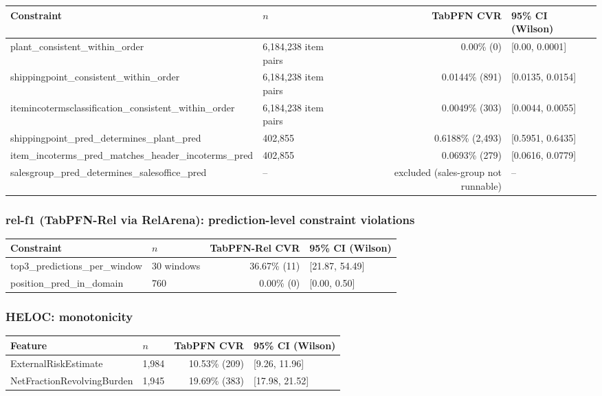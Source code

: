 \documentclass[11pt]{article}
\begin{document}
\begin{table}[h]
\centering
\small
\begin{tabularx}{\linewidth}{@{} L{5.9cm} l r l @{}}
\toprule
\textbf{Constraint} & \textbf{$n$} & \textbf{TabPFN CVR} & \textbf{95\% CI (Wilson)} \\
\midrule
plant\_consistent\_within\_order & 6{,}184{,}238 item pairs & 0.00\% (0) & [0.00, 0.0001] \\
shippingpoint\_consistent\_within\_order & 6{,}184{,}238 item pairs & 0.0144\% (891) & [0.0135, 0.0154] \\
itemincotermsclassification\_consistent\_within\_order & 6{,}184{,}238 item pairs & 0.0049\% (303) & [0.0044, 0.0055] \\
shippingpoint\_pred\_determines\_plant\_pred & 402{,}855 & 0.6188\% (2{,}493) & [0.5951, 0.6435] \\
item\_incoterms\_pred\_matches\_header\_incoterms\_pred & 402{,}855 & 0.0693\% (279) & [0.0616, 0.0779] \\
salesgroup\_pred\_determines\_salesoffice\_pred & -- & excluded (sales-group not runnable) & -- \\
\bottomrule
\end{tabularx}
\end{table}

\subsubsection{rel-f1 (TabPFN-Rel via RelArena): prediction-level constraint violations}

\begin{table}[h]
\centering
\small
\begin{tabular}{@{} l l r l @{}}
\toprule
\textbf{Constraint} & \textbf{$n$} & \textbf{TabPFN-Rel CVR} & \textbf{95\% CI (Wilson)} \\
\midrule
top3\_predictions\_per\_window & 30 windows & 36.67\% (11) & [21.87, 54.49] \\
position\_pred\_in\_domain & 760 & 0.00\% (0) & [0.00, 0.50] \\
\bottomrule
\end{tabular}
\end{table}

\subsubsection{HELOC: monotonicity}
\label{sec:tabpfn-heloc}

\begin{table}[h]
\centering
\small
\begin{tabular}{@{} l l r l @{}}
\toprule
\textbf{Feature} & \textbf{$n$} & \textbf{TabPFN CVR} & \textbf{95\% CI (Wilson)} \\
\midrule
ExternalRiskEstimate & 1{,}984 & 10.53\% (209) & [9.26, 11.96] \\
NetFractionRevolvingBurden & 1{,}945 & 19.69\% (383) & [17.98, 21.52] \\
\bottomrule
\end{tabular}
\end{table}
\end{document}
